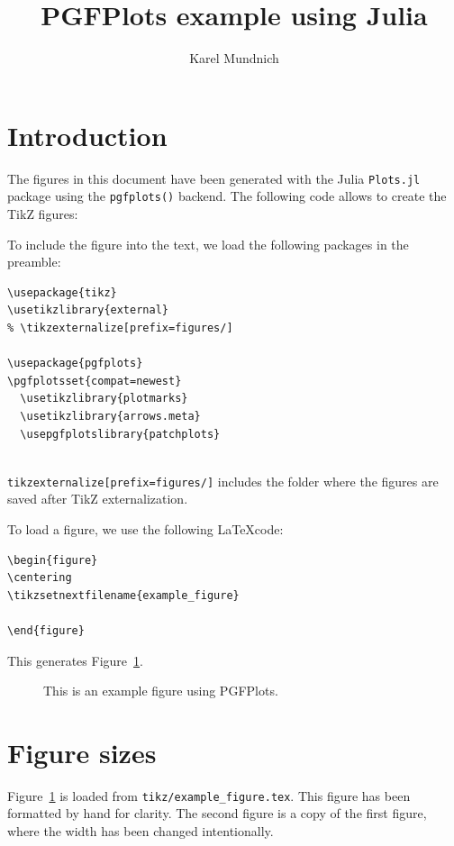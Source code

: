 \documentclass[9ptm,twocolumn]{article}
\title{PGFPlots example using Julia}
\author{Karel Mundnich}
\date{}
\begin{document}
\maketitle
\tikzexternaldisable

\section{Introduction}
The figures in this document have been generated with the Julia \texttt{Plots.jl} package using the \texttt{pgfplots()} backend. The following code allows to create the TikZ figures:


To include the figure into the text, we load the following packages in the preamble:
\begin{verbatim}
\usepackage{tikz}
\usetikzlibrary{external}
% \tikzexternalize[prefix=figures/]

\usepackage{pgfplots}
\pgfplotsset{compat=newest}
  \usetikzlibrary{plotmarks}
  \usetikzlibrary{arrows.meta}
  \usepgfplotslibrary{patchplots}
\end{verbatim}
\texttt{\\tikzexternalize[prefix=figures/]} includes the folder where the figures are saved after TikZ externalization.

To load a figure, we use the following \LaTeX code:

\begin{verbatim}
\begin{figure}
\centering
\tikzsetnextfilename{example_figure}

\end{figure}
\end{verbatim}

This generates Figure~\ref{fig:example}.

\begin{figure}
\centering
{}

\caption{This is an example figure using PGFPlots.}
\label{fig:example}
\end{figure}

\section{Figure sizes}
Figure~\ref{fig:example} is loaded from \texttt{tikz/example\_figure.tex}. This figure has been formatted by hand for clarity. The second figure is a copy of the first figure, where the width has been changed intentionally.
\end{document}
